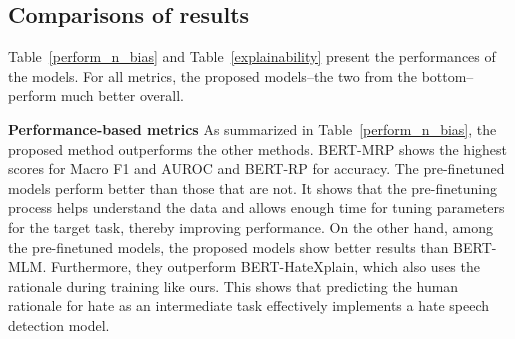\documentclass[11pt]{article}
\begin{document}
\subsection{Comparisons of results}

Table~\ref{perform_n_bias} and Table~\ref{explainability} present the performances of the models. For all metrics, the proposed models--the two from the bottom--perform much better overall.

\noindent
\textbf{Performance-based metrics}  As summarized in Table~\ref{perform_n_bias}, the proposed method outperforms the other methods. BERT-MRP shows the highest scores for Macro F1 and AUROC and BERT-RP for accuracy. The pre-finetuned models perform better than those that are not. It shows that the pre-finetuning process helps understand the data and allows enough time for tuning parameters for the target task, thereby improving performance. On the other hand, among the pre-finetuned models, the proposed models show better results than BERT-MLM. Furthermore, they outperform BERT-HateXplain, which also uses the rationale during training like ours. This shows that predicting the human rationale for hate as an intermediate task effectively implements a hate speech detection model.
\end{document}
